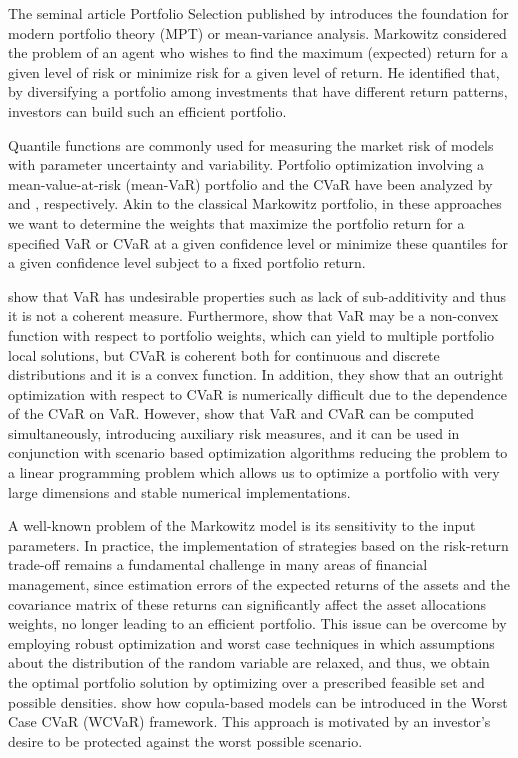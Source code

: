 \documentclass[a4paper,12pt]{report}
\begin{document}
\label{introduction}

The seminal article Portfolio Selection published by  \citet*{
	markowitz1952} introduces the foundation for modern portfolio theory (MPT) or mean-variance analysis. Markowitz considered the problem of an agent who wishes to find the maximum (expected) return for a given level of risk or minimize risk for a given level of return. He identified that, by diversifying a portfolio among investments
that have different return patterns, investors can build such an efficient
portfolio.

Quantile functions are commonly used for measuring the market risk of models
with parameter uncertainty and variability. Portfolio optimization involving
a mean-value-at-risk (mean-VaR) portfolio and the CVaR have been analyzed by %
\citet*{alexander2002} and \citet*{rockafellar2000}, respectively. Akin to
the classical Markowitz portfolio, in these approaches we want to determine
the weights that maximize the portfolio return for a specified VaR or CVaR
at a given confidence level or minimize these quantiles for a given
confidence level subject to a fixed portfolio return.

\citet*{artzner1999} show that VaR has undesirable properties such as lack
of sub-additivity and thus it is not a coherent measure. Furthermore, \citet*%
{uryasev2001} show that VaR may be a non-convex function with respect to
portfolio weights, which can yield to multiple portfolio local solutions,
but CVaR is coherent both for continuous and discrete distributions and it
is a convex function. In addition, they show that an outright optimization
with respect to CVaR is numerically difficult due to the dependence of the
CVaR on VaR. However, \citet*{rockafellar2000} show that VaR and CVaR can be
computed simultaneously, introducing auxiliary risk measures, and it can be
used in conjunction with scenario based optimization algorithms reducing the
problem to a linear programming problem which allows us to optimize a
portfolio with very large dimensions and stable numerical implementations.

A well-known problem of the Markowitz model is its sensitivity to the input parameters. In practice, the implementation of strategies based on the risk-return trade-off remains a fundamental challenge in many areas of financial management, since estimation errors of the expected returns of the assets and the covariance matrix of these returns can significantly affect the asset allocations weights, no longer leading to an efficient portfolio. This issue can be overcome by employing robust optimization and
worst case techniques \citet*{zhu2009worst} in which assumptions about the
distribution of the random variable are relaxed, and thus, we obtain the
optimal portfolio solution by optimizing over a prescribed feasible set and
possible densities. \citet*{kakouris14} show how copula-based models can be
introduced in the Worst Case CVaR (WCVaR) framework. This approach is
motivated by an investor's desire to be protected against the worst possible
scenario.
\end{document}
